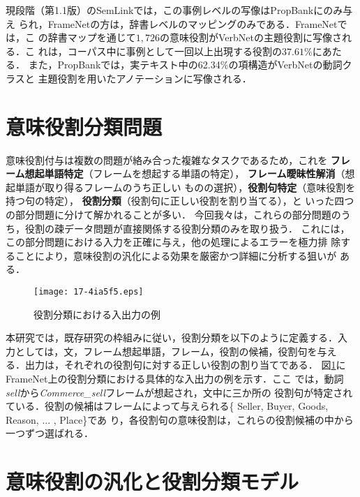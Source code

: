 \documentclass[japanese]{jnlp_1.4}
\begin{document}
現段階（第1.1版）のSemLinkでは，この事例レベルの写像はPropBankにのみ与え
られ，FrameNetの方は，辞書レベルのマッピングのみである．FrameNetでは，こ
の辞書マップを通じて$1,726$の意味役割がVerbNetの主題役割に写像される．こ
れは，コーパス中に事例として一回以上出現する役割の$37.61\%$にあたる．
また，PropBankでは，実テキスト中の62.34\%の項構造がVerbNetの動詞クラスと
主題役割を用いたアノテーションに写像される．



\section{意味役割分類問題}
\label{sec:role-classification}

意味役割付与は複数の問題が絡み合った複雑なタスクであるため，これを
{\bf フレーム想起単語特定}（フレームを想起する単語の特定），
{\bf フレーム曖昧性解消}（想起単語が取り得るフレームのうち正しい
ものの選択），{\bf 役割句特定}（意味役割を持つ句の特定），
{\bf 役割分類}（役割句に正しい役割を割り当てる），と
いった四つの部分問題に分けて解かれることが多い．
今回我々は，これらの部分問題のうち，役割の疎データ問題が直接関係する役割分類のみを取り扱う．
これには，この部分問題における入力を正確に与え，他の処理によるエラーを極力排
除することにより，意味役割の汎化による効果を厳密かつ詳細に分析する狙いが
ある．

\begin{figure}[t]
\begin{center}
\texttt{[image: 17-4ia5f5.eps]}
\end{center}
\caption{役割分類における入出力の例}
\label{input}
\end{figure}

本研究では，既存研究の枠組みに従い，役割分類を以下のように定義する．入
力としては，文，フレーム想起単語，フレーム，役割の候補，役割句を与え
る．出力は，それぞれの役割句に対する正しい役割の割り当てである．
図\ref{input}にFrameNet上の役割分類における具体的な入出力の例を示す．ここ
では，動詞{\it sell}から{\it Commerce\_sell}フレームが想起され，文中に三か所の
役割句が特定されている．役割の候補はフレームによって与えられる\{{\sf
Seller}, {\sf Buyer}, {\sf Goods}, {\sf Reason}, ... , {\sf Place}\}であ
り，各役割句の意味役割は，これらの役割候補の中から一つずつ選ばれる．



\section{意味役割の汎化と役割分類モデル}
\end{document}
